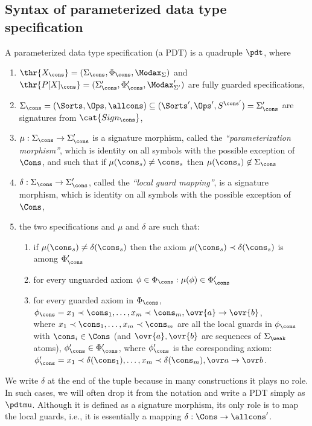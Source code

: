 \subsection{Syntax of parameterized data type specification}
\begin{definition}\label{def:parametersyntax}
A parameterized data type specification (a PDT) is a
 quadruple $\pdt$, %
where
\begin{enumerate}\MyLPar
\item 
$\thr{X_\cons}=(\Sigma_\cons,\Phi_\cons, \Modax_\Sigma)$ and $\thr{P[X]_\cons} =
 (\Sigma'_{\cons},\Phi'_{\cons}, \Modax'_{\Sigma'})$ are fully guarded specifications,
\item 
$\Sigma_\cons=(\Sorts,\Ops,\allcons)\subseteq
(\Sorts',\Ops',S^{\cons'})=\Sigma'_\cons$ are signatures from $\cat{Sign_\cons}$, 
\item 
$\mu:\Sigma_\cons\to \Sigma'_\cons$ is a signature morphism, called the {\em
``parameterization morphism''}, which is identity on all symbols with the
possible exception of $\Cons$, and such that if $\mu(\cons_s)\not=\cons_s$ then $\mu(\cons_s)\not\in\Sigma_\cons$
\item 
$\delta:\Sigma_\cons\to\Sigma'_\cons$, called the {\em ``local guard mapping''}, is 
a signature morphism, which is identity on all symbols with the
possible exception of $\Cons$,
\item\label{it:rel}
 the two specifications and $\mu$ and $\delta$ are such that:
\begin{enumerate}
\item\label{it:sat} if $\mu(\cons_s)\not=\delta(\cons_s)$ then the axiom
$\mu(\cons_s)\prec\delta(\cons_s)$ is among $\Phi'_\cons$
\item\label{it:unguard} for every unguarded axiom $\phi\in\Phi_\cons:\mu(\phi)\in\Phi'_\cons$
\item\label{it:corax} for every guarded axiom in $\Phi_\cons$, \\
\hspace*{2em} $\phi_\cons =x_1\prec\cons_1, \ldots ,x_m\prec\cons_m, \ovr{a}
 \to \ovr{b}$, \\ where
$x_1\prec\cons_1,\ldots,x_m\prec\cons_m$ are all the local guards in
$\phi_\cons$ with $\cons_i\in\Cons$ (and $\ovr{a}, \ovr{b}$ are sequences of $\Sigma_\weak$
atoms), 
$\phi_\cons'\in\Phi'_\cons$,
where $\phi'_\cons$ is the coresponding axiom:\\
\hspace*{2em}$\phi'_\cons=x_1\prec\delta(\cons_1),
\ldots ,x_m\prec\delta(\cons_m),\ovr a \to \ovr b$.
\end{enumerate}
\end{enumerate}
\end{definition}
%
We write $\delta$ at the end of the tuple because in many constructions it
plays no role. In such cases, we will often drop it from the notation and
write a PDT simply as $\pdtmu$. Although it is defined as a signature morphism,
its only role is to map the local guards, i.e., it is essentially a mapping
$\delta:\Cons\to{\allcons}'$. 
 
